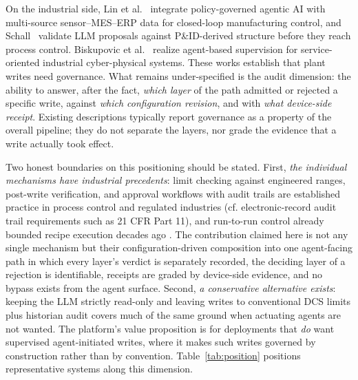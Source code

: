 On the industrial side, Lin et al.~\cite{lin2026agentic} integrate policy-governed
agentic AI with multi-source sensor--MES--ERP data for closed-loop
manufacturing control, and Schall~\cite{schall2026safe} validate LLM proposals
against P\&ID-derived structure before they reach process control.
Biskupovic et al.~\cite{biskupovic2025supervision} realize agent-based supervision for
service-oriented industrial cyber-physical systems. These works establish
that plant writes need governance. What remains under-specified is the
audit dimension: the ability to answer, after the fact, \emph{which layer}
of the path admitted or rejected a specific write, against \emph{which
configuration revision}, and with \emph{what device-side receipt}. Existing
descriptions typically report governance as a property of the overall
pipeline; they do not separate the layers, nor grade the evidence that a
write actually took effect.

Two honest boundaries on this positioning should be stated. First,
\emph{the individual mechanisms have industrial precedents}: limit
checking against engineered ranges, post-write verification, and
approval workflows with audit trails are established practice in
process control and regulated industries (cf. electronic-record audit
trail requirements such as 21 CFR Part 11), and run-to-run control
already bounded recipe execution decades ago \cite{moyne2000r2r}. The
contribution claimed here is not any single mechanism but their
configuration-driven composition into one agent-facing path in which
every layer's verdict is separately recorded, the deciding layer of a
rejection is identifiable, receipts are graded by device-side evidence,
and no bypass exists from the agent surface. Second, \emph{a conservative
alternative exists}: keeping the LLM strictly read-only and leaving
writes to conventional DCS limits plus historian audit covers much of
the same ground when actuating agents are not wanted. The platform's
value proposition is for deployments that \emph{do} want supervised
agent-initiated writes, where it makes such writes governed by
construction rather than by convention. Table~\ref{tab:position}
positions representative systems along this dimension.

